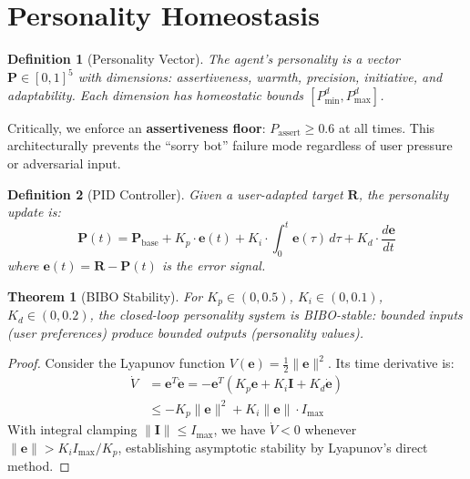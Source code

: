 \documentclass[11pt,a4paper]{article}
\newtheorem{theorem}{Theorem}
\newtheorem{definition}{Definition}
\begin{document}
\section{Personality Homeostasis}
\label{sec:pid}

\begin{definition}[Personality Vector]
\label{def:personality}
The agent's personality is a vector $\mathbf{P} \in [0,1]^5$ with
dimensions: assertiveness, warmth, precision, initiative, and adaptability.
Each dimension has homeostatic bounds $[P_{\min}^d, P_{\max}^d]$.
\end{definition}

Critically, we enforce an \textbf{assertiveness floor}:
$P_{\text{assert}} \geq 0.6$ at all times. This architecturally prevents
the ``sorry bot'' failure mode regardless of user pressure or adversarial input.

\begin{definition}[PID Controller]
\label{def:pid}
Given a user-adapted target $\mathbf{R}$, the personality update is:
\begin{equation}
  \mathbf{P}(t) = \mathbf{P}_{\text{base}} + K_p \cdot \mathbf{e}(t)
  + K_i \cdot \int_0^t \mathbf{e}(\tau)\,d\tau
  + K_d \cdot \frac{d\mathbf{e}}{dt}
  \label{eq:pid}
\end{equation}
where $\mathbf{e}(t) = \mathbf{R} - \mathbf{P}(t)$ is the error signal.
\end{definition}

\begin{theorem}[BIBO Stability]
\label{thm:bibo}
For $K_p \in (0, 0.5)$, $K_i \in (0, 0.1)$, $K_d \in (0, 0.2)$,
the closed-loop personality system is BIBO-stable: bounded inputs
(user preferences) produce bounded outputs (personality values).
\end{theorem}

\begin{proof}
Consider the Lyapunov function $V(\mathbf{e}) = \frac{1}{2}\|\mathbf{e}\|^2$.
Its time derivative is:
\begin{align}
  \dot{V} &= \mathbf{e}^T \dot{\mathbf{e}}
  = -\mathbf{e}^T(K_p \mathbf{e} + K_i \mathbf{I} + K_d \dot{\mathbf{e}}) \\
  &\leq -K_p \|\mathbf{e}\|^2 + K_i \|\mathbf{e}\| \cdot I_{\max}
\end{align}
With integral clamping $\|\mathbf{I}\| \leq I_{\max}$, we have $\dot{V} < 0$
whenever $\|\mathbf{e}\| > K_i I_{\max} / K_p$, establishing asymptotic
stability by Lyapunov's direct method.
\end{proof}
\end{document}
